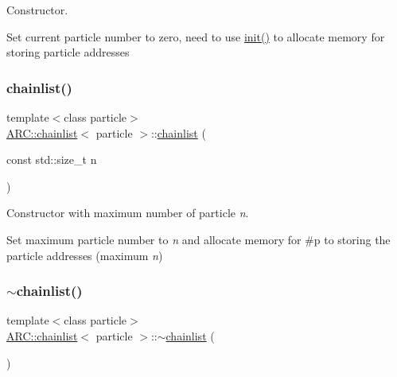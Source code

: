 Constructor. 

Set current particle number to zero, need to use \hyperlink{classARC_1_1chainlist_a84a2c65edf27bd25254e188ebf7d5dce}{init()} to allocate memory for storing particle addresses \hypertarget{classARC_1_1chainlist_a80fdd1846ac0d15cee0726a0f9548371}{}\label{classARC_1_1chainlist_a80fdd1846ac0d15cee0726a0f9548371} 
\subsubsection{\texorpdfstring{chainlist()}{chainlist()}\hspace{0.1cm}{\footnotesize\ttfamily [2/2]}}
{\footnotesize\ttfamily template$<$class particle$>$ \\
\hyperlink{classARC_1_1chainlist}{A\+R\+C\+::chainlist}$<$ particle $>$\+::\hyperlink{classARC_1_1chainlist}{chainlist} (\begin{DoxyParamCaption}\item[{const std\+::size\+\_\+t}]{n }\end{DoxyParamCaption})\hspace{0.3cm}{\ttfamily [inline]}}



Constructor with maximum number of particle {\itshape n}. 

Set maximum particle number to {\itshape n} and allocate memory for \#p to storing the particle addresses (maximum {\itshape n}) \hypertarget{classARC_1_1chainlist_ab24d982dbeee6269f2912747db6f9be4}{}\label{classARC_1_1chainlist_ab24d982dbeee6269f2912747db6f9be4} 
\subsubsection{\texorpdfstring{$\sim$chainlist()}{~chainlist()}}
{\footnotesize\ttfamily template$<$class particle$>$ \\
\hyperlink{classARC_1_1chainlist}{A\+R\+C\+::chainlist}$<$ particle $>$\+::$\sim$\hyperlink{classARC_1_1chainlist}{chainlist} (\begin{DoxyParamCaption}{ }\end{DoxyParamCaption})\hspace{0.3cm}{\ttfamily [inline]}}



